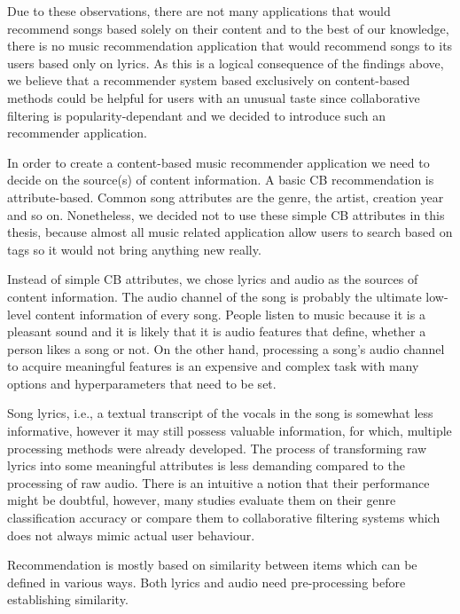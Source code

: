 Due to these observations, there are not many applications that would recommend songs based solely on their content and to the best of our knowledge, there is no music recommendation application that would recommend songs to its users based only on lyrics. As this is a logical consequence of the findings above, we believe that a recommender system based exclusively on content-based methods could be helpful for users with an unusual taste since collaborative filtering is popularity-dependant and we decided to introduce such an recommender application. 

In order to create a content-based music recommender application we need to decide on the source(s) of content information. A basic CB recommendation is attribute-based. Common song attributes are the genre, the artist, creation year and so on. Nonetheless, we decided not to use these simple CB attributes in this thesis, because almost all music related application allow users to search based on tags so it would not bring anything new really. 

Instead of simple CB attributes, we chose lyrics and audio as the sources of content information. The audio channel of the song is probably the ultimate low-level content information of every song. People listen to music because it is a pleasant sound and it is likely that it is audio features that define, whether a person likes a song or not. On the other hand, processing a song's audio channel to acquire meaningful features is an expensive and complex task with many options and hyperparameters that need to be set.

Song lyrics, i.e., a textual transcript of the vocals in the song is somewhat less informative, however it may still possess valuable information, for which, multiple processing methods were already developed. The process of transforming raw lyrics into some meaningful attributes is less demanding compared to the processing of raw audio. There is an intuitive a notion that their performance might be doubtful, however, many studies evaluate them on their genre classification accuracy \cite{DBLP:journals/corr/Tsaptsinos17} or compare them to collaborative filtering systems \cite{Gossi2016LyricBasedMR} which does not always mimic actual user behaviour.

Recommendation is mostly based on similarity between items which can be defined in various ways. Both lyrics and audio need pre-processing before establishing similarity. \\


